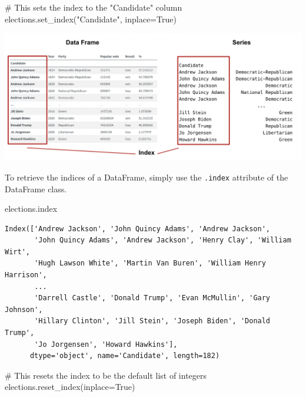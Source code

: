 \documentclass[
  letterpaper,
  DIV=11,
  numbers=noendperiod]{scrreprt}
\newenvironment{Shaded}{\begin{snugshade}}{\end{snugshade}}
\newcommand{\CommentTok}[1]{\textcolor[rgb]{0.37,0.37,0.37}{#1}}
\newcommand{\NormalTok}[1]{\textcolor[rgb]{0.00,0.23,0.31}{#1}}
\newcommand{\OperatorTok}[1]{\textcolor[rgb]{0.37,0.37,0.37}{#1}}
\newcommand{\StringTok}[1]{\textcolor[rgb]{0.13,0.47,0.30}{#1}}
\newcommand{\VariableTok}[1]{\textcolor[rgb]{0.07,0.07,0.07}{#1}}
\begin{document}
\begin{Shaded}
\begin{Highlighting}[]
\CommentTok{\# This sets the index to the "Candidate" column}
\NormalTok{elections.set\_index(}\StringTok{"Candidate"}\NormalTok{, inplace}\OperatorTok{=}\VariableTok{True}\NormalTok{)}
\end{Highlighting}
\end{Shaded}

\includegraphics{pandas_1/images/index_comparison_2.png}

To retrieve the indices of a DataFrame, simply use the \texttt{.index}
attribute of the DataFrame class.

\begin{Shaded}
\begin{Highlighting}[]
\NormalTok{elections.index}
\end{Highlighting}
\end{Shaded}

\begin{verbatim}
Index(['Andrew Jackson', 'John Quincy Adams', 'Andrew Jackson',
       'John Quincy Adams', 'Andrew Jackson', 'Henry Clay', 'William Wirt',
       'Hugh Lawson White', 'Martin Van Buren', 'William Henry Harrison',
       ...
       'Darrell Castle', 'Donald Trump', 'Evan McMullin', 'Gary Johnson',
       'Hillary Clinton', 'Jill Stein', 'Joseph Biden', 'Donald Trump',
       'Jo Jorgensen', 'Howard Hawkins'],
      dtype='object', name='Candidate', length=182)
\end{verbatim}

\begin{Shaded}
\begin{Highlighting}[]
\CommentTok{\# This resets the index to be the default list of integers}
\NormalTok{elections.reset\_index(inplace}\OperatorTok{=}\VariableTok{True}\NormalTok{) }
\end{Highlighting}
\end{Shaded}
\end{document}
